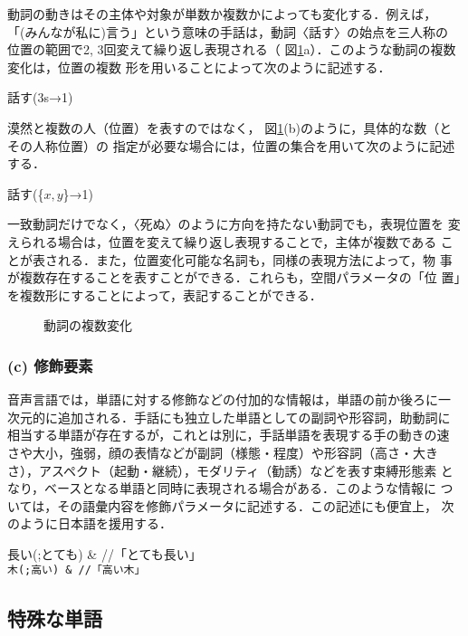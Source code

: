 動詞の動きはその主体や対象が単数か複数かによっても変化する．例えば，
「(みんなが私に)言う」という意味の手話は，動詞〈話す〉の始点を三人称の
位置の範囲で2, 3回変えて繰り返し表現される（
図\ref{fig:numberAgreement}a）．このような動詞の複数変化は，位置の複数
形を用いることによって次のように記述する．

\begin{ex}
  話す(3s→1)
\end{ex}


漠然と複数の人（位置）を表すのではなく，
図\ref{fig:numberAgreement}(b)のように，具体的な数（とその人称位置）の
指定が必要な場合には，位置の集合を用いて次のように記述する．

\begin{ex}
  話す(\{$x,y$\}→1)
\end{ex}

一致動詞だけでなく，〈死ぬ〉のように方向を持たない動詞でも，表現位置を
変えられる場合は，位置を変えて繰り返し表現することで，主体が複数である
ことが表される．また，位置変化可能な名詞も，同様の表現方法によって，物
事が複数存在することを表すことができる．これらも，空間パラメータの「位
置」を複数形にすることによって，表記することができる．
\begin{figure}
  \centering
  \epsfxsize=5cm
  \caption{動詞の複数変化}
  \label{fig:numberAgreement}
\end{figure}

\subsubsection*{(c) 修飾要素}

音声言語では，単語に対する修飾などの付加的な情報は，単語の前か後ろに一
次元的に追加される．手話にも独立した単語としての副詞や形容詞，助動詞に
相当する単語が存在するが，これとは別に，手話単語を表現する手の動きの速
さや大小，強弱，顔の表情などが副詞（様態・程度）や形容詞（高さ・大き
さ），アスペクト（起動・継続），モダリティ（勧誘）などを表す束縛形態素
となり，ベースとなる単語と同時に表現される場合がある．このような情報に
ついては，その語彙内容を修飾パラメータに記述する．この記述にも便宜上，
次のように日本語を援用する．

\begin{ex}
長い(;とても) & //「とても長い」 \\
\tt 木(;高い) &  //「高い木」
\end{ex}

\subsection{特殊な単語}

